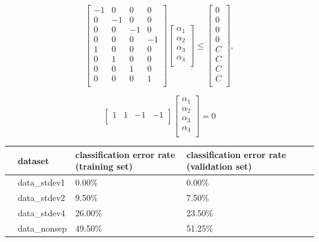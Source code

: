 \documentclass[10pt]{article}
\begin{document}
\[
\begin{bmatrix}
    -1 & 0 & 0 & 0 \\
    0 & -1 & 0 & 0 \\
    0 & 0 & -1 & 0 \\
    0 & 0 & 0 & -1 \\
    1 & 0 & 0 &0 \\
    0 & 1 & 0 & 0 \\
    0 & 0 & 1 & 0 \\
    0 & 0 & 0 & 1 \\
\end{bmatrix}
\begin{bmatrix}
    \alpha_1 \\
    \alpha_2 \\
    \alpha_3 \\
    \alpha_4 \\
\end{bmatrix} 
\leq
\begin{bmatrix}
0 \\
0 \\ 
0 \\ 
0 \\ 
C \\
C \\ 
C \\ 
C \\
\end{bmatrix},
\]

\[
\begin{bmatrix}
    1 & 1 & -1 & -1 \\
\end{bmatrix}
\begin{bmatrix}
    \alpha_1 \\
    \alpha_2 \\
    \alpha_3 \\
    \alpha_4 \\
\end{bmatrix} 
= 0
\]

\begin{table}
\begin{tabular}{llllll}
\toprule
{} & dataset & classification error rate (training set) & classification error rate (validation set) \\
\midrule
  & data\_stdev1 & 0.00\% & 0.00\% \\
  & data\_stdev2 & 9.50\% & 7.50\% \\
  & data\_stdev4 & 26.00\% & 23.50\% \\
  & data\_nonsep & 49.50\% & 51.25\% \\
\bottomrule
\end{tabular}
\end{table}
\end{document}
